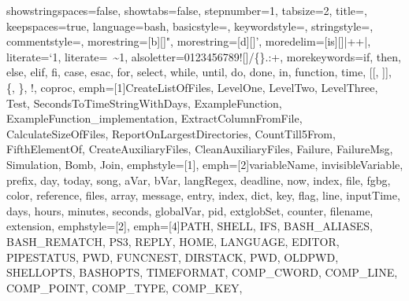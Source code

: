 {showstringspaces=false,             %
showtabs=false,                     %
stepnumber=1,                       %
tabsize=2,                          %
title=\lstname,                     %
%
keepspaces=true,                    %
language=bash,
basicstyle=\ttfamily\scriptsize\color{basic-color},
keywordstyle=\color{keywords-color},
stringstyle=\color{strings-color},
commentstyle=\color{comment-color},
morestring=[b][\color{strings-color}]{"},
morestring=[d][\color{strings-color}]{'},
moredelim=[is][\color{basic-color}]{|+}{+|}, %
literate={`}{\textasciigrave}1, %
literate={~}{{\textasciitilde}}1,
alsoletter=0123456789![]/\{\}.:+, %
morekeywords={if, then, else, elif, fi, case, esac, for, select, while, until, do, done, in, function, time, [[, ]], \{, \}, !, coproc}, %
emph=[1]{CreateListOfFiles, LevelOne, LevelTwo, LevelThree, Test, SecondsToTimeStringWithDays, ExampleFunction,
         ExampleFunction_implementation, ExtractColumnFromFile, CalculateSizeOfFiles, ReportOnLargestDirectories,
         CountTill5From, FifthElementOf, CreateAuxiliaryFiles, CleanAuxiliaryFiles, Failure, FailureMsg, Simulation, Bomb, Join},
emphstyle=[1]{\color{functions-color}}, %
emph=[2]{variableName, invisibleVariable, prefix, day, today, song, aVar, bVar, langRegex, deadline, now,
         index, file, fgbg, color, reference, files, array, message, entry, index, dict, key, flag, line, inputTime,
         days, hours, minutes, seconds, globalVar, pid, extglobSet, counter, filename, extension},
emphstyle=[2]{\color{variables-color}}, %
emph=[4]{PATH, SHELL, IFS, BASH_ALIASES, BASH_REMATCH, PS3, REPLY, HOME, LANGUAGE, EDITOR, PIPESTATUS, PWD, FUNCNEST,
         DIRSTACK, PWD, OLDPWD, SHELLOPTS, BASHOPTS, TIMEFORMAT, COMP_CWORD, COMP_LINE, COMP_POINT, COMP_TYPE, COMP_KEY,
}}
